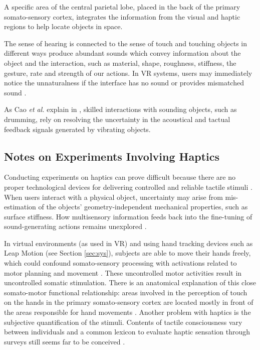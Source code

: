 \documentclass{article}
\begin{document}
A specific area of the central parietal lobe, placed in the back of the primary somato-sensory cortex, integrates the information from the visual and haptic regions to help locate objects in space. 

The sense of hearing is connected to the sense of touch and touching objects in different ways produce abundant sounds which convey information about the object and the interaction, such as material, shape, roughness, stiffness, the gesture, rate and strength of our actions. In VR systems, users may immediately notice the unnaturalness if the interface has no sound or provides mismatched sound \cite{Liu:2008}.

As Cao \emph{et al.} explain in  \cite{Cao:2016}, skilled interactions with sounding objects, such as drumming, rely on resolving the uncertainty in the acoustical and tactual feedback signals generated by vibrating objects. 

\subsection{Notes on Experiments Involving Haptics}
Conducting experiments on haptics can prove difficult because there are no proper technological devices for delivering controlled and reliable tactile stimuli \cite{Gallace2012}. 
When users interact with a physical object, uncertainty may arise from mis-estimation of the objects’ geometry-independent mechanical properties, such as surface stiffness. How multisensory information feeds back into the fine-tuning of sound-generating actions remains unexplored \cite{Cao:2016}. 

In virtual environments (as used in VR) and using hand tracking devices such as Leap Motion \cite{leapwebsite} (see Section \ref{sec:sys}), subjects are able to move their hands freely, which could confound somato-sensory processing with activations related to motor planning and movement \cite{Bodegard2001}. These uncontrolled motor activities result in uncontrolled somatic stimulation. There is an anatomical explanation of this close somato-motor functional relationship: areas involved in the perception of touch on the hands in the primary somato-sensory cortex are located mostly in front of the areas responsible for hand movements \cite{Penfield1950}.
Another problem with haptics is the subjective quantification of the stimuli. Contents of tactile consciousness vary between individuals and a common lexicon to evaluate haptic sensation through surveys still seems far to be conceived \cite{Gallace2010}.
\end{document}
